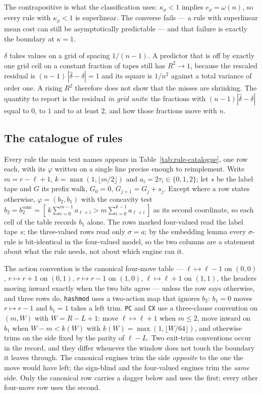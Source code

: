 \noindent The contrapositive is what the classification uses: $\kappa_{\rho}<1$ implies
$e_{\rho}=\omega(n)$, so every rule with $\kappa_{\rho}<1$ is superlinear. The converse
fails --- a rule with superlinear mean cost can still be asymptotically predictable --- and that
failure is exactly the boundary at $\kappa=1$.

\begin{remark}\label{rem:grid}
$\delta$ takes values on a grid of spacing $1/(n-1)$. A predictor that is off by exactly one grid cell
on a constant fraction of tapes still has $R^2\to1$, because the rescaled residual is
$(n-1)\,|\hat\delta-\delta|=1$ and its square is $1/n^2$ against a total variance of order one. A
rising $R^2$ therefore does not show that the misses are shrinking. The quantity to report is the
residual \emph{in grid units}: the fractions with $(n-1)|\hat\delta-\delta|$ equal to $0$, to $1$ and
to at least $2$, and how those fractions move with $n$.
\end{remark}

\subsection{The catalogue of rules}\label{app:catalogue}

Every rule the main text names appears in Table~\ref{tab:rule-catalogue}, one row each, with its
$\varphi$ written on a single line precise enough to reimplement. Write $m=r-\ell+1$,
$k=\max(1,\lfloor m/2\rfloor)$ and $a_i=2\tau_i\in\{0,1,2\}$; let $s$ be the label tape and $G$ its
prefix walk, $G_0=0$, $G_{j+1}=G_j+s_j$. Except where a row states otherwise,
$\varphi=(b_2,b_1)$ with the concavity test
$b_2=b_2^{\mathrm{conc}}=[\,k\sum_{i=0}^{m-1}a_{\ell+i}>m\sum_{i=0}^{k-1}a_{\ell+i}\,]$ as its second
coordinate, so each cell of the table records $b_1$ alone. The rows marked four-valued read the label
tape $s$; the three-valued rows read only $\sigma=a$; by the embedding lemma every $\sigma$-rule is
bit-identical in the four-valued model, so the two columns are a statement about what the rule needs,
not about which engine ran it.

The action convention is the canonical four-move table --- $\ell\mapsto\ell-1$ on $(0,0)$,
$r\mapsto r+1$ on $(0,1)$, $r\mapsto r-1$ on $(1,0)$, $\ell\mapsto\ell+1$ on $(1,1)$, the headers
moving inward exactly when the two bits agree --- unless the row says otherwise, and three rows do.
\texttt{hashmod} uses a two-action map that ignores $b_2$: $b_1=0$ moves $r\mapsto r-1$ and $b_1=1$
takes a left trim. \texttt{PC} and \texttt{CX} use a three-clause convention on $(m,W)$ with
$W=R-L+1$: move $\ell\mapsto\ell+1$ when $m\le2$, move inward on $b_1$ when $W-m<k(W)$ with
$k(W)=\max(1,\lfloor W/64\rfloor)$, and otherwise trims on the side fixed by the parity of $\ell-L$.
Two exit-trim conventions occur in the record, and they differ whenever the window does not touch the
boundary it leaves through. The canonical engines trim the side \emph{opposite} to the one the move
would have left; the sign-blind and the four-valued engines trim the \emph{same} side. Only the
canonical row carries a dagger below and uses the first; every other four-move row uses the second.

